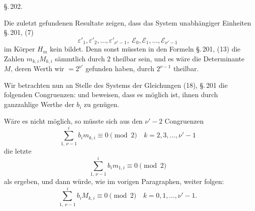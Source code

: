 
\S.\,202.


Die zuletzt gefundenen Resultate zeigen, dass das System
unabhängiger Einheiten \S.\,201, (7)
\[ \varepsilon'_1, \varepsilon'_2, \ldots, \varepsilon'_{\nu'-1}, \; \mathcal{E}_0, \mathcal{E}_1, \ldots, \mathcal{E}_{\nu'-1} \]
im Körper $H_m$ kein  bildet. Denn sonst
müssten in den Formeln \S.\,201, (13) die Zahlen
$m_{k,i} M_{k,i}$ sämmtlich durch 2 theilbar sein, und es wäre
die Determinante $M$, deren Werth wir $= 2^{\nu'}$ gefunden
haben, durch $2^{\nu-1}$ theilbar.

Wir betrachten nun an Stelle des Systems der Gleichungen (18),
\S.\,201 die folgenden Congruenzen:
und beweisen, dass es möglich ist, ihnen durch ganzzahlige
Werthe der $b_i$ zu genügen.

Wäre es nicht möglich, so müsste sich aus den $\nu'-2$
Congruenzen
\[ \sum_{1,\,\nu-1}^{i} b_i m_{k,i} \equiv 0 \pmod{2} \quad k = 2, 3, \ldots, \nu'-1 \]
die letzte
\[ \sum_{1,\,\nu-1}^{i} b_i m_{1,i} \equiv 0 \pmod{2} \]
als  ergeben, und dann würde, wie im vorigen
Paragraphen, weiter folgen:
\[ \sum_{1,\,\nu-1}^{i} b_i M_{k,i} \equiv 0 \pmod{2} \quad k = 0, 1, \ldots, \nu'-1. \]
